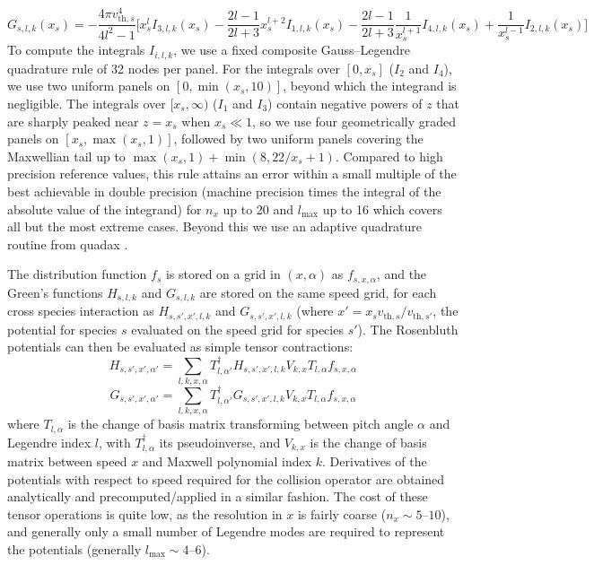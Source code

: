 \documentclass[11pt]{article}
\begin{document}
\begin{equation}
G_{s,l,k}(x_s) = -\frac{4\pi v_{\mathrm{th},s}^4}{4l^2-1}
\Bigg[ {x_s^l} I_{3,l,k}(x_s) - \frac{2l-1}{2l+3}x_s^{l+2} I_{1,l,k}(x_s)
- \frac{2l-1}{2l+3} \frac{1}{x_s^{l+1}} I_{4,l,k}(x_s)
+ \frac{1}{x_s^{l-1}} I_{2,l,k}(x_s) \Bigg]
\end{equation}
To compute the integrals $I_{i,l,k}$, we use a fixed composite Gauss--Legendre quadrature
rule of 32 nodes per panel. For the integrals over $[0, x_s]$ ($I_2$ and $I_4$), we use
two uniform panels on $[0, \min(x_s, 10)]$, beyond which the integrand is negligible.
The integrals over $[x_s, \infty)$ ($I_1$ and $I_3$) contain negative powers of $z$ that
are sharply peaked near $z = x_s$ when $x_s \ll 1$, so we use four geometrically
graded panels on $[x_s, \max(x_s, 1)]$, followed by two uniform panels covering
the Maxwellian tail up to $\max(x_s, 1) + \min(8, 22/x_s + 1)$. Compared to
high precision reference values, this rule attains an error within a small
multiple of the best achievable in double precision (machine precision times the
integral of the absolute value of the integrand) for $n_x$ up to 20 and $l_{\max}$
up to 16 which covers all but the most extreme cases. Beyond this we use an adaptive
quadrature routine from quadax \cite{Conlin_quadax}.

The distribution function $f_s$ is stored on a grid in $(x, \alpha)$ as
$f_{s,x,\alpha}$, and the Green's functions $H_{s,l,k}$ and $G_{s,l,k}$ are
stored on the same speed grid, for each cross species interaction as
$H_{s,s',x',l,k}$ and $G_{s,s',x',l,k}$ (where $x' = x_s v_{\mathrm{th},s}/v_{\mathrm{th},s'}$,
the potential for species $s$ evaluated on the speed grid for species $s'$). The
Rosenbluth potentials can then be evaluated as simple tensor contractions:
\begin{equation}
H_{s, s',x',\alpha'} = \sum_{l,k,x,\alpha} T^{\dagger}_{l,\alpha'} H_{s,s',x',l,k}
V_{k,x}T_{l,\alpha}f_{s,x,\alpha}
\end{equation}
\begin{equation}
G_{s, s',x',\alpha'} = \sum_{l,k,x,\alpha} T^{\dagger}_{l,\alpha'} G_{s,s',x',l,k}
V_{k,x}T_{l,\alpha}f_{s,x,\alpha}
\end{equation}
where $T_{l,\alpha}$ is the change of basis matrix transforming between pitch
angle $\alpha$ and Legendre index $l$, with $T^\dagger_{l,\alpha}$ its pseudoinverse, and $V_{k,x}$ is the change of basis
matrix between speed $x$ and Maxwell polynomial index $k$. Derivatives of the
potentials with respect to speed required for the collision operator are
obtained analytically and precomputed/applied in a similar fashion. The cost of
these tensor operations is quite low, as the resolution in $x$ is fairly coarse
($n_x \sim 5$--$10$), and generally only a small number of Legendre modes are
required to represent the potentials (generally $l_{\max} \sim 4$--$6$).



\end{document}
